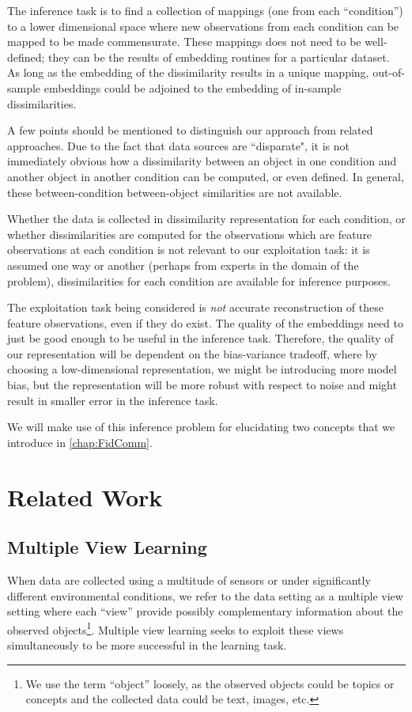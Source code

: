 \documentclass[12pt,oneside,final]{thesis}\usepackage[]{graphicx}\usepackage[]{color}
\begin{document}
 
 
The inference task  is to find a collection of mappings (one from each ``condition'') to a lower dimensional space where new observations from each condition can be mapped to be made commensurate. These mappings does not need to be  well-defined; they can be the results of embedding routines for a particular dataset. As long as the embedding of the dissimilarity results in a  unique mapping,  out-of-sample embeddings could be adjoined to the embedding of in-sample dissimilarities.

A few points should be mentioned to distinguish our approach from related approaches.
 Due to the fact that data sources are ``disparate", it is not immediately obvious how  a dissimilarity between an object in one condition and another object in another condition  can be computed, or even defined.  In general, these between-condition between-object  similarities are not available.
 
 Whether the data is collected in dissimilarity representation for each condition, or whether dissimilarities are computed for the observations which are feature observations at each condition is not relevant to our exploitation task: it is assumed one way or another (perhaps from experts in the domain of the problem),  dissimilarities for each condition are available for inference purposes. 

The exploitation task  being considered is \emph{not} accurate reconstruction of these feature observations, even if they do exist. The quality of the  embeddings need to just be  good enough to be useful in the inference task. Therefore, the quality of our representation will be dependent on the bias-variance tradeoff, where by choosing a low-dimensional representation, we might be introducing more model bias, but the representation will be more  robust with respect to noise and might result in smaller error in the inference task.

We will make use of this inference problem for elucidating two concepts that we introduce  in \ref{chap:FidComm}.




\chapter{Related Work}
\label{sec:Related}



\section{Multiple View Learning}
\label{sec:section}
When data are collected using a multitude of sensors or under significantly different environmental conditions, we refer to  the data setting as a multiple view setting where each ``view'' provide possibly complementary  information about the observed objects\footnote{We use the term ``object''  loosely, as the observed objects could be topics or concepts and the  collected data could be text, images, etc.}. Multiple view learning seeks to exploit these views simultaneously to be more successful in the learning task.
\end{document}
